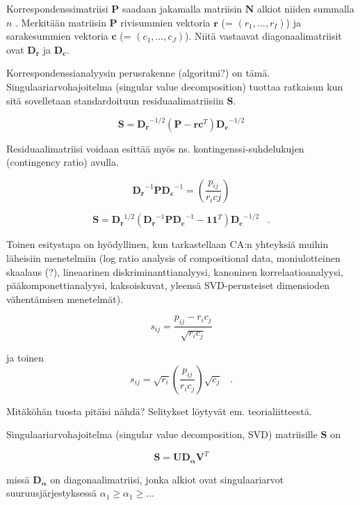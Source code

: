 \documentclass[finnish,]{article}
\begin{document}
Korrespondenssimatriisi \(\boldsymbol{P}\) saadaan jakamalla matriisin
\(\boldsymbol{N}\) alkiot niiden summalla \(n\) . Merkitään matriisin
\(\boldsymbol{P}\) rivisummien vektoria \(\boldsymbol{r}\) (=
\((r_{1}, \dots, r_{I})\)) ja sarakesummien vektoria \(\boldsymbol{c}\)
(= \((c_{1}, \dots, c_{J})\)). Niitä vastaavat diagonaalimatriisit ovat
\(\boldsymbol{D_r}\) ja \(\boldsymbol{D_c}\).

Korrespondenssianalyysin perusrakenne (algoritmi?) on tämä.
Singulaariarvohajoitelma (singular value decomposition) tuottaa
ratkaisun kun sitä sovelletaan standardoituun residuaalimatriisiin
\(\boldsymbol{S}\).

\begin{equation}
\boldsymbol{S} = \boldsymbol{D_r}^{-1/2}(\boldsymbol{P} - \boldsymbol{r}\boldsymbol{c}^T)\boldsymbol{D_c}^{-1/2} \label{A}
\end{equation}

Residuaalimatriisi voidaan esittää myös ns. kontingenssi-suhdelukujen
(contingency ratio) avulla.

\[
\boldsymbol{D_r}^{-1} \boldsymbol{P} \boldsymbol{D_c}^{-1} = \left( \frac{p_{ij}} {r_{i} c{j}} \right)
\]

\[ 
\boldsymbol{S} = \boldsymbol{D_r}^{1/2} (\boldsymbol{D_r}^{-1} \boldsymbol{P} \boldsymbol{D_c}^{-1} - \boldsymbol{1}\boldsymbol{1}^{T} ) \boldsymbol{D_c}^{-1/2}  \;\;\; .
\]

Toinen esitystapa on hyödyllinen, kun tarkastellaan CA:n yhteyksiä
muihin läheisiin menetelmiin (log ratio analysis of compositional data,
moniulotteinen skaalaus (?), lineaarinen diskriminanttianalyysi,
kanoninen korrelaatioanalyysi, pääkomponettianalyysi, kaksoiskuvat,
yleensä SVD-perusteiset dimensioden vähentämisen menetelmät).

\[
s_{ij} = \frac{p_{ij}-r_{i}c_{j}} { \sqrt{r_{i}c_{j} } }
\]

ja toinen \[
s_{ij} = \sqrt{r_{i}} \left( \frac{p_{ij}}{r_{i}c_{j}} \right) \sqrt{c_{j}} \;\;\; .
\]

Mitäköhän tuosta pitäisi nähdä? Selitykset löytyvät em.
teorialiitteestä.

Singulaariarvohajoitelma (singular value decomposition, SVD) matriisille
\(\boldsymbol{S}\) on

\[ 
\boldsymbol{S} = \boldsymbol{U} \boldsymbol{D_{\alpha}} \boldsymbol{V}^{T}
\]

missä \(\boldsymbol{D_{\alpha}}\) on diagonaalimatriisi, jonka alkiot
ovat singulaariarvot suuruusjärjestyksessä
\(\alpha_{1}\geq \alpha_{1} \geq \hdots\)
\end{document}
